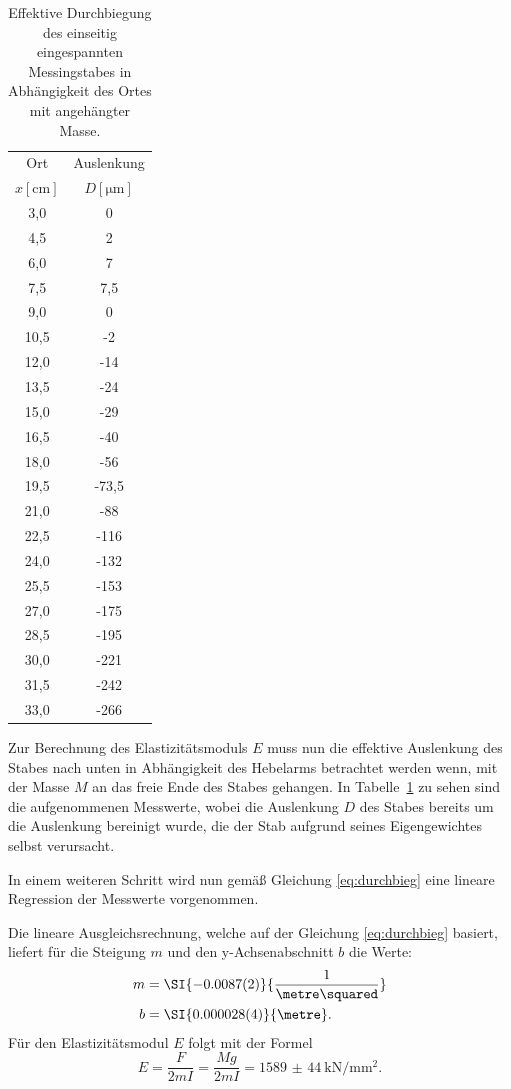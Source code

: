 \documentclass[
  bibliography=totoc,     %
  captions=tableheading,  %
  titlepage=firstiscover, %
]{scrartcl}
\begin{document}
\begin{table}[H]
    \centering
    \caption{Effektive Durchbiegung des einseitig eingespannten Messingstabes in Abhängigkeit des Ortes mit angehängter Masse.}
    \begin{tabular}{cc}
        \toprule
        {Ort} & {Auslenkung} \\
        {$x[\si{\centi\metre}]$} & {$D[\si{\micro\metre}]$} \\
        \midrule
         3,0 &    0 \\
         4,5 &    2 \\
         6,0 &    7 \\
         7,5 &  7,5 \\
         9,0 &    0 \\
        10,5 &   -2 \\
        12,0 &  -14 \\
        13,5 &  -24 \\
        15,0 &  -29 \\
        16,5 &  -40 \\
        18,0 &  -56 \\
        19,5 &-73,5 \\
        21,0 &  -88 \\
        22,5 & -116 \\
        24,0 & -132 \\
        25,5 & -153 \\
        27,0 & -175 \\
        28,5 & -195 \\
        30,0 & -221 \\
        31,5 & -242 \\
        33,0 & -266 \\
        \bottomrule
    \end{tabular}
    \label{tab2:messing}
\end{table}
Zur Berechnung des Elastizitätsmoduls $E$ muss nun die effektive Auslenkung des
Stabes nach unten in Abhängigkeit des Hebelarms betrachtet werden wenn, mit der
Masse $M$ an das freie Ende des Stabes gehangen. In Tabelle~\ref{tab2:messing}
zu sehen sind die aufgenommenen Messwerte, wobei die Auslenkung $D$ des Stabes
bereits um die Auslenkung bereinigt wurde, die der Stab aufgrund seines Eigengewichtes
selbst verursacht.

In einem weiteren Schritt wird nun gemäß Gleichung \eqref{eq:durchbieg} eine
lineare Regression der Messwerte vorgenommen.

Die lineare Ausgleichsrechnung, welche auf der Gleichung \eqref{eq:durchbieg}
basiert, liefert für die Steigung $m$ und den y-Achsenabschnitt $b$ die Werte:
\begin{align}
    m &= \SI{-0.0087(2)}{\frac{1}{\metre\squared}} \\
    b &= \SI{0.000028(4)}{\metre}.
\end{align}
Für den Elastizitätsmodul $E$ folgt mit der Formel
\begin{equation}
    E = \frac{F}{2mI} = \frac{Mg}{2mI} = \SI{1589(44)}{\kilo\newton\per\milli\metre\squared}.
    \label{eq:E}
\end{equation}
\end{document}
